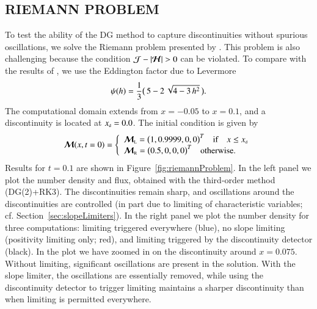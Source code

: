 \documentclass[11pt,letterpaper,twoside,english,final]{article}
\begin{document}
\subsection{RIEMANN PROBLEM}

To test the ability of the DG method to capture discontinuities without spurious oscillations, we solve the Riemann problem presented by \citet{OHF2012}.  
This problem is also challenging because the condition $\cJ-|\bcH|>0$ can be violated.  
To compare with the results of \citet{OHF2012}, we use the Eddington factor due to Levermore \citep{levermore_1984}
\begin{equation}
  \psi(h)=\frac{1}{3}\big(\,5-2\,\sqrt{4-3\,h^{2}}\,\big).  
  \label{eq:eddingtonFactorLevermore}
\end{equation}
The computational domain extends from $x=-0.05$ to $x=0.1$, and a discontinuity is located at $x_{\mbox{\tiny d}}=0.0$.  
The initial condition is given by
\begin{equation}
  \boldsymbol{\mathcal{M}}(x,t=0)=
  \left\{
  \begin{array}{l}
  \boldsymbol{\mathcal{M}}_{\mbox{\tiny L}}=\big(1,0.9999,0,0\big)^{T} \quad\text{if}\quad x\le x_{\mbox{\tiny d}} \\
  \boldsymbol{\mathcal{M}}_{\mbox{\tiny R}}=\big(0.5,0,0,0\big)^{T} \quad\text{otherwise}.
  \end{array}
  \right.
  \label{eq:riemannProblem}
\end{equation}
Results for $t=0.1$ are shown in Figure~\ref{fig:riemannProblem}.  
In the left panel we plot the number density and flux, obtained with the third-order method (DG(2)+RK3).  
The discontinuities remain sharp, and oscillations around the discontinuities are controlled (in part due to limiting of characteristic variables; cf. Section~\ref{sec:slopeLimiters}).  
In the right panel we plot the number density for three computations: limiting triggered everywhere (blue), no slope limiting (positivity limiting only; red), and limiting triggered by the discontinuity detector (black).  
In the plot we have zoomed in on the discontinuity around $x=0.075$.  
Without limiting, significant oscillations are present in the solution.  
With the slope limiter, the oscillations are essentially removed, while using the discontinuity detector to trigger limiting maintains a sharper discontinuity than when limiting is permitted everywhere.  
\end{document}
